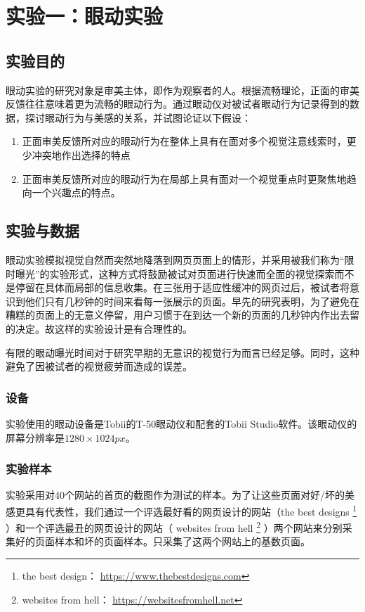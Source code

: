\chapter{实验一：眼动实验}
\label{exp1}

\section{实验目的}
眼动实验的研究对象是审美主体，即作为观察者的人。根据流畅理论，正面的审美反馈往往意味着更为流畅的眼动行为。通过眼动仪对被试者眼动行为记录得到的数据，探讨眼动行为与美感的关系，并试图论证以下假设：

\begin{enumerate}
  \item 正面审美反馈所对应的眼动行为在整体上具有在面对多个视觉注意线索时，更少冲突地作出选择的特点
  \item 正面审美反馈所对应的眼动行为在局部上具有面对一个视觉重点时更聚焦地趋向一个兴趣点的特点。
\end{enumerate}

\section{实验与数据}
眼动实验模拟视觉自然而突然地降落到网页页面上的情形，并采用被我们称为“限时曝光”的实验形式，这种方式将鼓励被试对页面进行快速而全面的视觉探索而不是停留在具体而局部的信息收集。在三张用于适应性缓冲的网页过后，被试者将意识到他们只有几秒钟的时间来看每一张展示的页面。早先的研究表明，为了避免在糟糕的页面上的无意义停留，用户习惯于在到达一个新的页面的几秒钟内作出去留的决定。故这样的实验设计是有合理性的。

有限的眼动曝光时间对于研究早期的无意识的视觉行为而言已经足够。同时，这种避免了因被试者的视觉疲劳而造成的误差。

\subsection{设备}
实验使用的眼动设备是Tobii的T-50眼动仪和配套的Tobii Studio软件。该眼动仪的屏幕分辨率是$1280\times1024px$。

\subsection{实验样本}
实验采用对40个网站的首页的截图作为测试的样本。为了让这些页面对好/坏的美感更具有代表性，我们通过一个评选最好看的网页设计的网站（the best designs
\footnote{
the best design：
\href{https://www.thebestdesigns.com}{https://www.thebestdesigns.com}
}
）和一个评选最丑的网页设计的网站（ websites from hell
\footnote{
websites from hell：
\href{https://websitesfromhell.net}{https://websitesfromhell.net}
}
）两个网站来分别采集好的页面样本和坏的页面样本。只采集了这两个网站上的基数页面。

